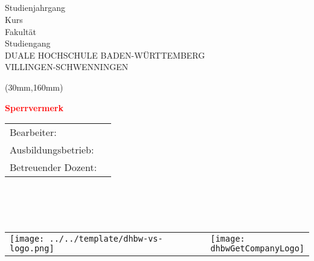 \thispagestyle{empty}


\begin{center}
\vspace*{1cm} \ \\
{\fontsize{40}{48}\selectfont \bfseries \dhbwGetTitle \\}
\vspace{0.75cm}
{\Large\bfseries \dhbwGetSubtitle \\}
\vspace{1.5cm}
\dhbwGetTextType \\
Studienjahrgang \dhbwGetAcademicYear \\
Kurs \dhbwGetCourse \\
\vspace{1.5cm}
Fakultät \dhbwGetFaculty \\
Studiengang \dhbwGetFieldOfStudy \\
DUALE HOCHSCHULE BADEN-WÜRTTEMBERG\\
VILLINGEN-SCHWENNINGEN\\
\end{center}
\begin{textblock*}{50mm}(30mm,160mm)
    \begin{rotate}{50}
        \fontsize{34}{40}\bfseries\textcolor{red}{Sperrvermerk}
    \end{rotate}
\end{textblock*}
\begin{table}[b]
\begin{tabular}{ll}
Bearbeiter: 		&	\dhbwGetAuthor \\
Ausbildungsbetrieb:	&	\dhbwGetCompanyName \\
Betreuender Dozent:	&	\dhbwGetLecturer \\
\end{tabular}\\
\\
\\
\begin{tabularx}{\textwidth}{lXl}
\texttt{[image: ../../template/dhbw-vs-logo.png]} &
&
\raisebox{\height}{\texttt{[image: \\dhbwGetCompanyLogo]} }
\end{tabularx}
\end{table}

\restoregeometry
